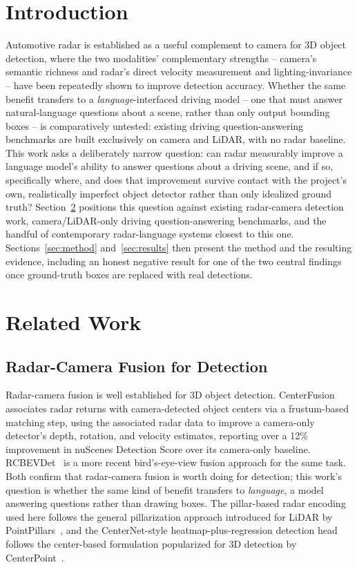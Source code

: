 \documentclass[conference]{IEEEtran}
\begin{document}
\section{Introduction}
Automotive radar is established as a useful complement to camera for 3D object detection, where the two
modalities' complementary strengths -- camera's semantic richness and radar's direct velocity measurement and
lighting-invariance -- have been repeatedly shown to improve detection accuracy. Whether the same benefit
transfers to a \emph{language}-interfaced driving model -- one that must answer natural-language questions about a
scene, rather than only output bounding boxes -- is comparatively untested: existing driving question-answering
benchmarks are built exclusively on camera and LiDAR, with no radar baseline. This work asks a deliberately narrow
question: can radar measurably improve a language model's ability to answer questions about a driving scene, and
if so, specifically where, and does that improvement survive contact with the project's own, realistically
imperfect object detector rather than only idealized ground truth? Section~\ref{sec:related} positions this
question against existing radar-camera detection work, camera/LiDAR-only driving question-answering benchmarks,
and the handful of contemporary radar-language systems closest to this one. Sections~\ref{sec:method}
and~\ref{sec:results} then present the method and the resulting evidence, including an honest negative result for
one of the two central findings once ground-truth boxes are replaced with real detections.

\section{Related Work}
\label{sec:related}

\subsection{Radar-Camera Fusion for Detection}
Radar-camera fusion is well established for 3D object detection. CenterFusion~\cite{nabati2021centerfusion}
associates radar returns with camera-detected object centers via a frustum-based matching step, using the
associated radar data to improve a camera-only detector's depth, rotation, and velocity estimates, reporting
over a 12\% improvement in nuScenes Detection Score over its camera-only baseline. RCBEVDet~\cite{lin2024rcbevdet}
is a more recent bird's-eye-view fusion approach for the same task. Both confirm that radar-camera fusion is
worth doing for detection; this work's question is whether the same kind of benefit transfers to \emph{language},
a model answering questions rather than drawing boxes. The pillar-based radar encoding used here follows the
general pillarization approach introduced for LiDAR by PointPillars~\cite{lang2019pointpillars}, and the
CenterNet-style heatmap-plus-regression detection head follows the center-based formulation popularized for 3D
detection by CenterPoint~\cite{yin2021centerpoint}.
\end{document}

